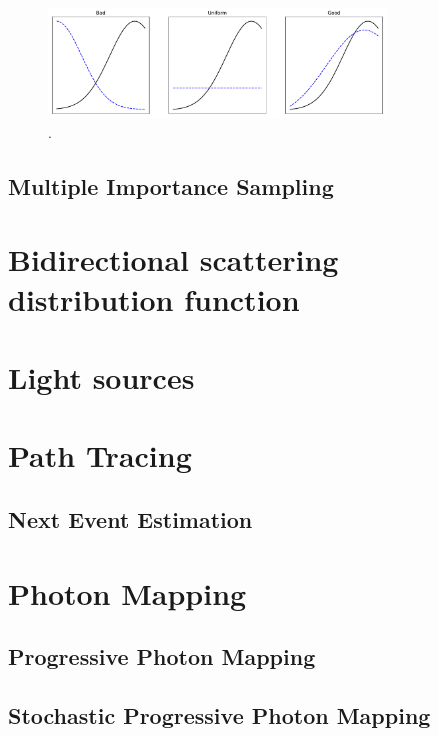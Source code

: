 \begin{figure}
    \centering
    \includegraphics[width=0.8\textwidth]{figures/plots/importancesampling.pdf}
    \caption{.}
    \label{fig:importancesample}
\end{figure}

\subsection{Multiple Importance Sampling}

\section{Bidirectional scattering distribution function}


\section{Light sources}


\section{Path Tracing}
\subsection{Next Event Estimation}



\section{Photon Mapping}
\label{sec:PM}

\subsection{Progressive Photon Mapping}

\subsection{Stochastic Progressive Photon Mapping}



